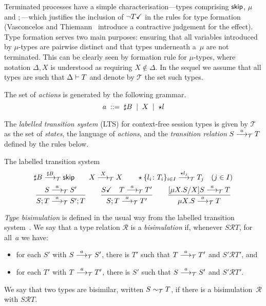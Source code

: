 Terminated processes have a simple characterisation---types comprising
$\skipk$, $\mu$ and $;$---which justifies the inclusion of
$\neg\DONE T$ in the rules for type formation (Vasconcelos and
Thiemann~\cite{thiemann2016context} introduce a contractive judgement
for the effect).
%
Type formation serves two main purposes: ensuring that all variables
introduced by $\mu$-types are pairwise distinct and that types
underneath a~$\mu$ are not terminated. This can be clearly seen by
formation rule for $\mu$-types, where notation $\Delta,X$ is
understood as requiring $X\notin\Delta$.
%
In the sequel we assume that all types are such that $\isType T$ and
denote by $\mathcal{T}$ the set such types.

The set of \emph{actions} is generated by the following grammar.
\begin{equation*}
  a \grmeq \sharp B \grmor X \grmor \star l
\end{equation*}

The \emph{labelled transition system} (LTS) for context-free session
types is given by $\mathcal{T}$ as the set of \emph{states}, the
language of \emph{actions}, and the \emph{transition relation}
$S\LTSderives T$ defined by the rules below.

\noindent The labelled transition system\hfill{}
%
\begin{gather*}
  \sharp B \LTSderives[\sharp B] \skipk
  \qquad
  X \LTSderives[X] X
  \qquad
  \star\{l_i\colon T_i\}_{i\in I} \LTSderives[\star l_j] T_j\quad
  (j\in I)
  \\
  \frac{S \LTSderives S'}{S; T \LTSderives S';T}
  \qquad
  \frac{\DONE{S} \quad T \LTSderives T'}{S; T \LTSderives T'}
  \qquad
  \frac{\subs{\mu X.S}{X}S \LTSderives T}{\mu X.S \LTSderives T}
\end{gather*}

\emph{Type bisimulation} is defined in the usual way from the labelled
transition system~\cite{sangiorgi2014introduction}.
%
We say that a type relation $\mathcal R$ is a \emph{bisimulation} if,
whenever $S\mathcal RT$, for all~$a$ we have:
%
\begin{itemize}
\item for each $S'$ with $S \LTSderives S'$, there is $T'$ such that $T
  \LTSderives T'$ and $S'\mathcal RT'$, and
\item for each $T'$ with $T \LTSderives T'$, there is $S'$ such that $S
  \LTSderives S'$ and $S'\mathcal RT'$.
\end{itemize}
%
We say that two types are bisimilar, written $S \bisim T$, if there
is a bisimulation~$\mathcal R$ with $S\mathcal RT$.

